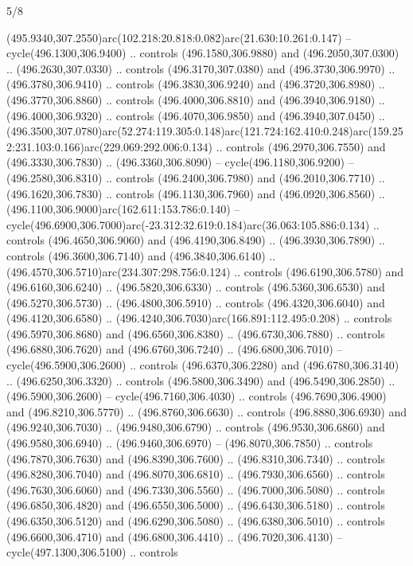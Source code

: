 \begin{flagdescription}{5/8}
\begin{scope}[xshift=0.5\flaglength,yshift=0.5\flagwidth,scale=\flagwidth/475.63]
\begin{scope}[y=0.8pt, x=0.8pt, yscale=-1, xscale=1,shift={(-450,-300)}]
\begin{scope}[cm={{1.0,0.0,0.0,1.0,(-0.0002,0.12556)}},cm={{1.0,0.0,0.0,1.0,(0.00179,0.0)}}]
\begin{scope}[cm={{1.11592,0.0,0.0,1.11592,(-106.89933,-41.77764)}}]
\begin{scope}[draw=black,fill=cfff]
\begin{scope}[fill=black]
  (495.9340,307.2550)arc(102.218:20.818:0.082)arc(21.630:10.261:0.147) --
  cycle(496.1300,306.9400) .. controls (496.1580,306.9880) and
  (496.2050,307.0300) .. (496.2630,307.0330) .. controls (496.3170,307.0380) and
  (496.3730,306.9970) .. (496.3780,306.9410) .. controls (496.3830,306.9240) and
  (496.3720,306.8980) .. (496.3770,306.8860) .. controls (496.4000,306.8810) and
  (496.3940,306.9180) .. (496.4000,306.9320) .. controls (496.4070,306.9850) and
  (496.3940,307.0450) ..
  (496.3500,307.0780)arc(52.274:119.305:0.148)arc(121.724:162.410:0.248)arc(159.252:231.103:0.166)arc(229.069:292.006:0.134)
  .. controls (496.2970,306.7550) and (496.3330,306.7830) .. (496.3360,306.8090)
  -- cycle(496.1180,306.9200) -- (496.2580,306.8310) .. controls
  (496.2400,306.7980) and (496.2010,306.7710) .. (496.1620,306.7830) .. controls
  (496.1130,306.7960) and (496.0920,306.8560) ..
  (496.1100,306.9000)arc(162.611:153.786:0.140) --
  cycle(496.6900,306.7000)arc(-23.312:32.619:0.184)arc(36.063:105.886:0.134) ..
  controls (496.4650,306.9060) and (496.4190,306.8490) .. (496.3930,306.7890) ..
  controls (496.3600,306.7140) and (496.3840,306.6140) ..
  (496.4570,306.5710)arc(234.307:298.756:0.124) .. controls (496.6190,306.5780)
  and (496.6160,306.6240) .. (496.5820,306.6330) .. controls (496.5360,306.6530)
  and (496.5270,306.5730) .. (496.4800,306.5910) .. controls (496.4320,306.6040)
  and (496.4120,306.6580) .. (496.4240,306.7030)arc(166.891:112.495:0.208) ..
  controls (496.5970,306.8680) and (496.6560,306.8380) .. (496.6730,306.7880) ..
  controls (496.6880,306.7620) and (496.6760,306.7240) .. (496.6800,306.7010) --
  cycle(496.5900,306.2600) .. controls (496.6370,306.2280) and
  (496.6780,306.3140) .. (496.6250,306.3320) .. controls (496.5800,306.3490) and
  (496.5490,306.2850) .. (496.5900,306.2600) -- cycle(496.7160,306.4030) ..
  controls (496.7690,306.4900) and (496.8210,306.5770) .. (496.8760,306.6630) ..
  controls (496.8880,306.6930) and (496.9240,306.7030) .. (496.9480,306.6790) ..
  controls (496.9530,306.6860) and (496.9580,306.6940) .. (496.9460,306.6970) --
  (496.8070,306.7850) .. controls (496.7870,306.7630) and (496.8390,306.7600) ..
  (496.8310,306.7340) .. controls (496.8280,306.7040) and (496.8070,306.6810) ..
  (496.7930,306.6560) .. controls (496.7630,306.6060) and (496.7330,306.5560) ..
  (496.7000,306.5080) .. controls (496.6850,306.4820) and (496.6550,306.5000) ..
  (496.6430,306.5180) .. controls (496.6350,306.5120) and (496.6290,306.5080) ..
  (496.6380,306.5010) .. controls (496.6600,306.4710) and (496.6800,306.4410) ..
  (496.7020,306.4130) -- cycle(497.1300,306.5100) .. controls

\end{scope}
\end{scope}
\end{scope}
\end{scope}
\end{scope}
\end{scope}
\end{flagdescription}
